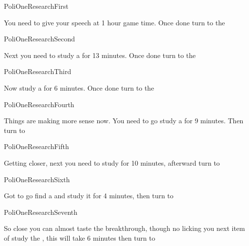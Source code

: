 \documentclass[greennotebook]{guildcamp3} %
\begin{document}
\startnotebook{\nPoliOneResearch{}}

\begin{page}{PoliOneResearchFirst}
	
You need to give your speech at 1 hour game time. Once done turn to the 
	
\end{page}

\begin{page}{PoliOneResearchSecond}
	
Next you need to study a \iMagnet{} for 13 minutes. Once done turn to the 

	
\end{page}

\begin{page}{PoliOneResearchThird}
	
Now study a \iCentrifuge{} for 6 minutes. Once done turn to the 
	
\end{page}

\begin{page}{PoliOneResearchFourth}
	
	Things are making more sense now. You need to go study a \iLeadPipe{} for 9 minutes. Then turn to 
	
\end{page}

\begin{page}{PoliOneResearchFifth}
	
	Getting closer, next you need to study \iScrapMetal{} for 10 minutes, afterward turn to  
	
\end{page}

\begin{page}{PoliOneResearchSixth}
	
	 Got to go find a \iSieve{} and study it for 4 minutes, then turn to  
	
\end{page}

\begin{page}{PoliOneResearchSeventh}
	
	So close you can almost taste the breakthrough, though no licking you next item of study the \iMonoBlade{}, this will take 6 minutes then turn to  
	
\end{page}
\end{document}
